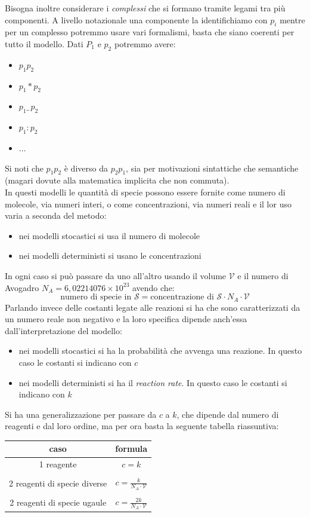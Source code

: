 \documentclass[a4paper,12pt, oneside]{book}
\begin{document}
Bisogna inoltre considerare i \textit{complessi} che si formano tramite legami
tra più componenti. A livello notazionale una componente la identifichiamo con
$p_i$ mentre per un complesso potremmo usare vari formalismi, basta che siano
coerenti per tutto il modello. Dati $P_1$ e $p_2$ potremmo avere:
\begin{itemize}
  \item $p_1p_2$
  \item $p_1*p_2$
  \item $p_1\_\,p_2$
  \item $p_1:p_2$
  \item $\ldots$
\end{itemize}
Si noti che $p_1p_2$ è diverso da $p_2p_1$, sia per motivazioni sintattiche che
semantiche (magari dovute alla matematica implicita che non commuta).\\
In questi modelli  le quantità di specie possono essere fornite come numero di
molecole, via numeri interi, o come concentrazioni, via numeri reali e il lor
uso varia a seconda del metodo:
\begin{itemize}
  \item nei modelli stocastici si usa il numero di molecole
  \item nei modelli deterministi si usano le concentrazioni
\end{itemize}
In ogni caso si può passare da uno all'altro usando il volume $\mathcal{V}$ e il
numero di Avogadro $N_A=6,02214076\times 10^{23}$ avendo che:
\[\mbox{numero di specie in }\mathcal{S}=\mbox{concentrazione di
  }\mathcal{S}\cdot N_A\cdot \mathcal{V}\]
Parlando invece delle costanti legate alle reazioni si ha che sono
caratterizzati da un numero reale non negativo e la loro specifica dipende
anch'essa dall'interpretazione del modello:
\begin{itemize}
  \item nei modelli stocastici si ha la probabilità che avvenga una reazione. In
  questo caso le costanti si indicano con $c$
  \item nei modelli deterministi si ha il \textit{reaction rate}. In
  questo caso le costanti si indicano con $k$
\end{itemize}
Si ha una generalizzazione per passare da $c$ a $k$, che dipende dal numero di
reagenti e dal loro ordine, ma per ora basta la seguente
tabella riassuntiva:
\begin{table}[H]
  \centering
  \begin{tabular}{c|c}
    caso&formula\\
    \hline
    1 reagente & $c=k$\\
    &\\
    2 reagenti di specie diverse & $c=\frac{k}{N_A\cdot \mathcal{V}}$\\
    &\\
    2 reagenti di specie ugaule & $c=\frac{2k}{N_A\cdot \mathcal{V}}$
  \end{tabular}
\end{table}
\end{document}
